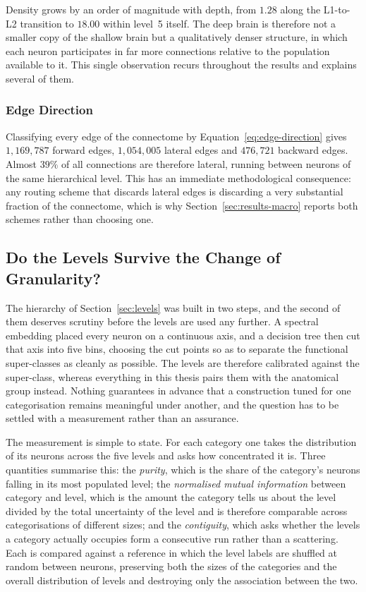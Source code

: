 \documentclass[12pt,a4paper,oneside]{article}
\theoremstyle{definition}
\theoremstyle{plain}
\begin{document}
Density grows by an order of magnitude with depth, from $1.28$ along the
L1-to-L2 transition to $18.00$ within level~5 itself. The deep brain is
therefore not a smaller copy of the shallow brain but a qualitatively denser
structure, in which each neuron participates in far more connections
relative to the population available to it. This single observation recurs
throughout the results and explains several of them.

\subsubsection{Edge Direction}

Classifying every edge of the connectome by
Equation~\eqref{eq:edge-direction} gives $1{,}169{,}787$ forward edges,
$1{,}054{,}005$ lateral edges and $476{,}721$ backward edges. Almost $39\%$
of all connections are therefore lateral, running between neurons of the
same hierarchical level. This has an immediate methodological consequence:
any routing scheme that discards lateral edges is discarding a very
substantial fraction of the connectome, which is why
Section~\ref{sec:results-macro} reports both schemes rather than choosing
one.

\subsection{Do the Levels Survive the Change of Granularity?}
\label{sec:results-coherence}

The hierarchy of Section~\ref{sec:levels} was built in two steps, and the
second of them deserves scrutiny before the levels are used any further. A
spectral embedding placed every neuron on a continuous axis, and a decision
tree then cut that axis into five bins, choosing the cut points so as to
separate the functional super-classes as cleanly as possible. The levels are
therefore calibrated against the super-class, whereas everything in this
thesis pairs them with the anatomical group instead. Nothing guarantees in
advance that a construction tuned for one categorisation remains meaningful
under another, and the question has to be settled with a measurement rather
than an assurance.

The measurement is simple to state. For each category one takes the
distribution of its neurons across the five levels and asks how concentrated
it is. Three quantities summarise this: the \emph{purity}, which is the share
of the category's neurons falling in its most populated level; the
\emph{normalised mutual information} between category and level, which is
the amount the category tells us about the level divided by the total
uncertainty of the level and is therefore comparable across categorisations
of different sizes; and the \emph{contiguity}, which asks whether the levels
a category actually occupies form a consecutive run rather than a scattering.
Each is compared against a reference in which the level labels are shuffled
at random between neurons, preserving both the sizes of the categories and
the overall distribution of levels and destroying only the association
between the two.
\end{document}
